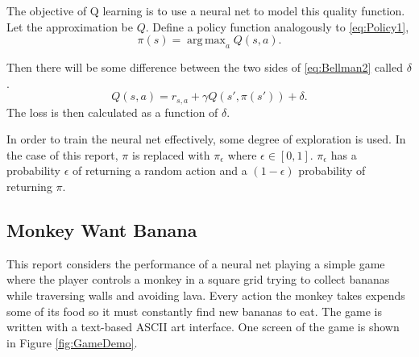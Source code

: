 \documentclass[%
 reprint,
nofootinbib,
 amsmath,amssymb,
 aps,
]{revtex4-1}
\DeclareMathOperator*{\argmax}{arg\,max}
\begin{document}
The objective of Q learning is to use a neural net to model this quality function. Let the approximation be $Q$. Define a policy function analogously to \eqref{eq:Policy1},
\begin{equation}
  \pi(s) = \argmax_a Q(s,a). \label{eq:Policy2}
\end{equation}

 Then there will be some difference between the two sides of \eqref{eq:Bellman2} called $\delta$.
\begin{equation}
  Q(s,a) = r_{s,a} + \gamma Q(s', \pi(s')) + \delta. \label{eq:delta}
\end{equation}
The loss is then calculated as a function of $\delta$.

In order to train the neural net effectively, some degree of exploration is used. In the case of this report, $\pi$ is replaced with $\pi_\epsilon$ where $\epsilon\in[0,1]$. $\pi_\epsilon$ has a probability $\epsilon$ of returning a random action and a $(1-\epsilon)$ probability of returning $\pi$. 

\subsection{\label{sec:Monkey}Monkey Want Banana}
This report considers the performance of a neural net playing a simple game where the player controls a monkey in a square grid trying to collect bananas while traversing walls and avoiding lava. Every action the monkey takes expends some of its food so it must constantly find new bananas to eat. The game is written with a text-based ASCII art interface. One screen of the game is shown in Figure \ref{fig:GameDemo}.
\end{document}
